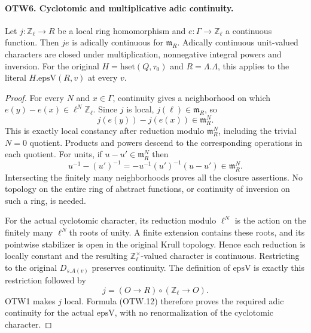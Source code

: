 \paragraph{OTW6. Cyclotomic and multiplicative adic continuity.}
\label{claim:OTW6}
Let $j:\mathbb Z_\ell\to R$ be a local ring homomorphism and
$e:\Gamma\to\mathbb Z_\ell$ a continuous function.  Then
$j e$ is adically continuous for $\mathfrak m_R$.  Adically
continuous unit-valued characters are closed under multiplication,
nonnegative integral powers and inversion.  For the original
$H=\mathrm{hset}(Q,\tau_0)$ and $R=\Lambda.\Lambda$, this applies
to the literal $H.\mathrm{epsV}(R,v)$ at every $v$.
\begin{proof}
For every $N$ and $x\in\Gamma$, continuity gives a neighborhood
on which $e(y)-e(x)\in\ell^N\mathbb Z_\ell$.
Since $j$ is local, $j(\ell)\in\mathfrak m_R$, so
\[
              j(e(y))-j(e(x))\in\mathfrak m_R^N.
              \tag{OTW.12}
\]
This is exactly local constancy after reduction modulo
$\mathfrak m_R^N$, including the trivial $N=0$ quotient.
Products and powers descend to the corresponding operations in
each quotient.  For units, if $u-u'\in\mathfrak m_R^N$ then
\[
              u^{-1}-(u')^{-1}=-u^{-1}(u')^{-1}(u-u')
                         \in\mathfrak m_R^N.          \tag{OTW.13}
\]
Intersecting the finitely many neighborhoods proves all the
closure assertions.  No topology on the entire ring of abstract
functions, or continuity of inversion on such a ring, is needed.

For the actual cyclotomic character, its reduction modulo
$\ell^N$ is the action on the finitely many $\ell^N$th roots of
unity.  A finite extension contains these roots, and its pointwise
stabilizer is open in the original Krull topology.  Hence each
reduction is locally constant and the resulting
$\mathbb Z_\ell^\times$-valued character is continuous.  Restricting
to the original $D_{s.A(v)}$ preserves continuity.
The definition of $\mathrm{epsV}$ is exactly this restriction
followed by
\[
             j=(O\longrightarrow R)\circ(\mathbb Z_\ell\longrightarrow O).
             \tag{OTW.14}
\]
OTW1 makes $j$ local.  Formula (OTW.12) therefore proves the
required adic continuity for the actual $\mathrm{epsV}$, with no
renormalization of the cyclotomic character.
\end{proof}

